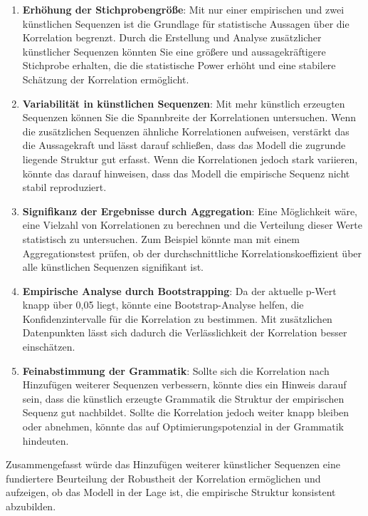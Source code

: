 \documentclass[
]{article}
\begin{document}
\begin{enumerate}
\def\labelenumi{\arabic{enumi}.}
\item
  \textbf{Erhöhung der Stichprobengröße}: Mit nur einer empirischen und
  zwei künstlichen Sequenzen ist die Grundlage für statistische Aussagen
  über die Korrelation begrenzt. Durch die Erstellung und Analyse
  zusätzlicher künstlicher Sequenzen könnten Sie eine größere und
  aussagekräftigere Stichprobe erhalten, die die statistische Power
  erhöht und eine stabilere Schätzung der Korrelation ermöglicht.
\item
  \textbf{Variabilität in künstlichen Sequenzen}: Mit mehr künstlich
  erzeugten Sequenzen können Sie die Spannbreite der Korrelationen
  untersuchen. Wenn die zusätzlichen Sequenzen ähnliche Korrelationen
  aufweisen, verstärkt das die Aussagekraft und lässt darauf schließen,
  dass das Modell die zugrunde liegende Struktur gut erfasst. Wenn die
  Korrelationen jedoch stark variieren, könnte das darauf hinweisen,
  dass das Modell die empirische Sequenz nicht stabil reproduziert.
\item
  \textbf{Signifikanz der Ergebnisse durch Aggregation}: Eine
  Möglichkeit wäre, eine Vielzahl von Korrelationen zu berechnen und die
  Verteilung dieser Werte statistisch zu untersuchen. Zum Beispiel
  könnte man mit einem Aggregationstest prüfen, ob der durchschnittliche
  Korrelationskoeffizient über alle künstlichen Sequenzen signifikant
  ist.
\item
  \textbf{Empirische Analyse durch Bootstrapping}: Da der aktuelle
  p-Wert knapp über 0,05 liegt, könnte eine Bootstrap-Analyse helfen,
  die Konfidenzintervalle für die Korrelation zu bestimmen. Mit
  zusätzlichen Datenpunkten lässt sich dadurch die Verlässlichkeit der
  Korrelation besser einschätzen.
\item
  \textbf{Feinabstimmung der Grammatik}: Sollte sich die Korrelation
  nach Hinzufügen weiterer Sequenzen verbessern, könnte dies ein Hinweis
  darauf sein, dass die künstlich erzeugte Grammatik die Struktur der
  empirischen Sequenz gut nachbildet. Sollte die Korrelation jedoch
  weiter knapp bleiben oder abnehmen, könnte das auf
  Optimierungspotenzial in der Grammatik hindeuten.
\end{enumerate}

Zusammengefasst würde das Hinzufügen weiterer künstlicher Sequenzen eine
fundiertere Beurteilung der Robustheit der Korrelation ermöglichen und
aufzeigen, ob das Modell in der Lage ist, die empirische Struktur
konsistent abzubilden.
\end{document}
